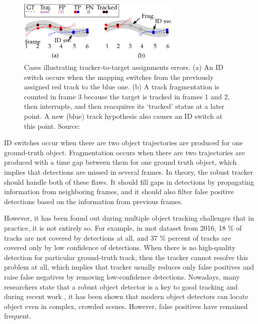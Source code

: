 \begin{introduction}
        \begin{figure}[ht]
          \centering
          \includegraphics[width=0.7\textwidth]{resources/tracking_errors.png}
          \caption{Cases illustrating tracker-to-target assignments errors. (a) An ID switch occurs when the mapping switches from the previously assigned red track to the blue one. (b) A track fragmentation is counted in frame 3 because the target is tracked in frames 1 and 2, then interrupts, and then reacquires its ‘tracked’ status at a later point. A new (blue) track hypothesis also causes an ID switch at this point. Source: \cite{MOTChallenge2015}}
          \label{fig:id switch example}
        \end{figure}
        
        ID switches occur when there are two object trajectories are produced for one ground-truth object. Fragmentation occurs when there are two trajectories are produced with a time gap between them for one ground truth object, which implies that detections are missed in several frames. In theory, the robust tracker should handle both of these flaws. It should fill gaps in detections by propagating information from neighboring frames, and it should also filter false positive detections based on the information from previous frames. 
        
        However, it has been found out during multiple object tracking challenges that in practice, it is not entirely so. For example, in \gls{mot} \cite{mot16} dataset from 2016, 18 \% of tracks are not covered by detections at all, and 37 \% percent of tracks are covered only by low confidence of detections. When there is no high-quality detection for particular ground-truth track, then the tracker cannot resolve this problem at all, which implies that tracker usually reduces only false positives and raise false negatives by removing low-confidence detections. Nowadays, many researchers state that a robust object detector is a key to good tracking \cite{mot16, konushin2017, bewley2016simple} and during recent work \cite{luo2014multiple, fan2016survey, DBLP:journals/corr/abs-1903-05625}, it has been shown that modern object detectors can locate object even in complex, crowded scenes. However, false positives have remained frequent. 
        

\end{introduction}
